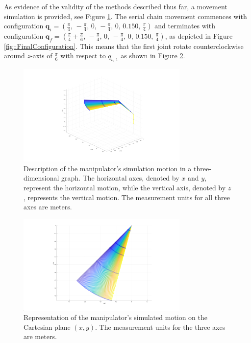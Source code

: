  As evidence of the validity of the methods described thus far, a movement simulation is provided, see Figure \ref{fig::MotionOfTheManipulator}. The serial chain movement commences with configuration $\mathbf{q}_i = (\frac{\pi}{4},\,-\frac{\pi}{4},\,0,\,-\frac{\pi}{4},\,0,\,0.150,\,\frac{\pi}{4})$ and terminates with configuration $\mathbf{q}_f = (\frac{\pi}{4}+\frac{\pi}{6},\,-\frac{\pi}{4},\,0,\,-\frac{\pi}{4},\,0,\,0.150,\,\frac{\pi}{4})$, as depicted in Figure \ref{fig::FinalConfiguration}. This means that the first joint rotate counterclockwise around $z$-axis of $\frac{\pi}{6}$ with respect to $q_{i,\,1}$ as shown in Figure \ref{fig::MotionOfTheManipulator_top}.
 
 \begin{figure}
	\centering
	\includegraphics[width=0.75\textwidth]{Resources/MotionOfTheManipulator}
	\caption{Description of the manipulator’s simulation motion in a three-dimensional graph. The horizontal axes, denoted by $x$ and $y$, represent the horizontal motion, while the vertical axis, denoted by $z$, represents the vertical motion. The measurement units for all three axes are meters.}
	\label{fig::MotionOfTheManipulator}
\end{figure}
\begin{figure}
	\centering
	\includegraphics[width=0.75\textwidth]{Resources/MotionOfTheManipulator_top}
	\caption{Representation of the manipulator’s simulated motion on the Cartesian plane $(x, y)$. The measurement units for the three axes are meters.}
	\label{fig::MotionOfTheManipulator_top}
\end{figure}
